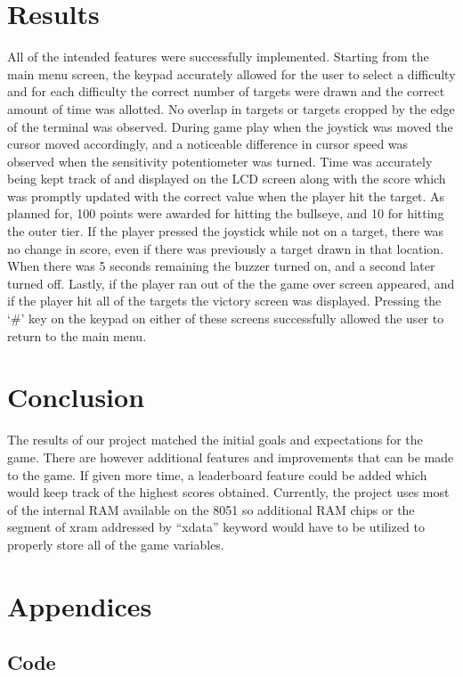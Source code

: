 \documentclass[12pt]{article}
\begin{document}
\section{Results}
All of the intended features were successfully implemented. Starting from the main menu screen, the keypad accurately allowed for the user to select a difficulty and for each difficulty the correct number of targets were drawn and the correct amount of time was allotted. No overlap in targets or targets cropped by the edge of the terminal was observed. During game play when the joystick was moved the cursor moved accordingly, and a noticeable difference in cursor speed was observed when the sensitivity potentiometer was turned. Time was accurately being kept track of and displayed on the LCD screen along with the score which was promptly updated with the correct value when the player hit the target. As planned for, 100 points were awarded for hitting the bullseye, and 10 for hitting the outer tier. If the player pressed the joystick while not on a target, there was no change in score, even if there was previously a target drawn in that location. When there was 5 seconds remaining the buzzer turned on, and a second later turned off. Lastly, if the player ran out of the the game over screen appeared, and if the player hit all of the targets the victory screen was displayed. Pressing the `\#' key on the keypad on either of these screens successfully allowed the user to return to the main menu.

\section{Conclusion}
The results of our project matched the initial goals and expectations for the game. There are however additional features and improvements that can be made to the game. If given more time, a leaderboard feature could be added which would keep track of the highest scores obtained. Currently, the project uses most of the internal RAM available on the 8051 so additional RAM chips or the segment of xram addressed by ``xdata'' keyword would have to be utilized to properly store all of the game variables.


\section{Appendices}
\subsection{Code}

\end{document}
